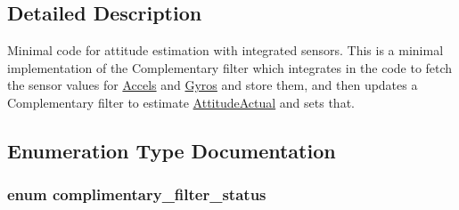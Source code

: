 \subsection{\-Detailed \-Description}
\-Minimal code for attitude estimation with integrated sensors. \-This is a minimal implementation of the \-Complementary filter which integrates in the code to fetch the sensor values for \hyperlink{group___accels}{\-Accels} and \hyperlink{group___gyros}{\-Gyros} and store them, and then updates a \-Complementary filter to estimate \hyperlink{group___attitude_actual}{\-Attitude\-Actual} and sets that. 

\subsection{\-Enumeration \-Type \-Documentation}
\hypertarget{group___attitude_module_c_c_ga198f64773276a5901d9c79690465e5db}{
\subsubsection[{complimentary\-\_\-filter\-\_\-status}]{\setlength{\rightskip}{0pt plus 5cm}enum {\bf complimentary\-\_\-filter\-\_\-status}}}\label{group___attitude_module_c_c_ga198f64773276a5901d9c79690465e5db}
